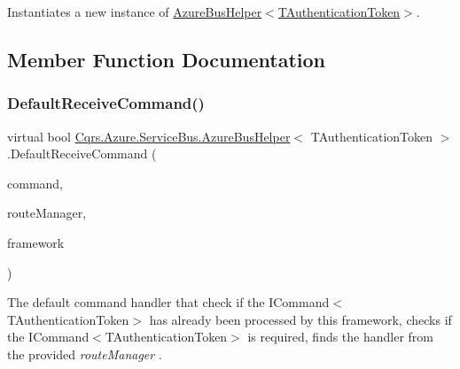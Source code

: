 Instantiates a new instance of \hyperlink{classCqrs_1_1Azure_1_1ServiceBus_1_1AzureBusHelper_af4ca8255d3eb87180c5e24996e1f6e15_af4ca8255d3eb87180c5e24996e1f6e15}{Azure\+Bus\+Helper$<$\+T\+Authentication\+Token$>$}. 



\subsection{Member Function Documentation}
\mbox{\label{classCqrs_1_1Azure_1_1ServiceBus_1_1AzureBusHelper_ae35c260f46f8aa7ba928815187b9088e_ae35c260f46f8aa7ba928815187b9088e}} 
\subsubsection{\texorpdfstring{Default\+Receive\+Command()}{DefaultReceiveCommand()}}
{\footnotesize\ttfamily virtual bool \hyperlink{classCqrs_1_1Azure_1_1ServiceBus_1_1AzureBusHelper}{Cqrs.\+Azure.\+Service\+Bus.\+Azure\+Bus\+Helper}$<$ T\+Authentication\+Token $>$.Default\+Receive\+Command (\begin{DoxyParamCaption}\item[{\hyperlink{interfaceCqrs_1_1Commands_1_1ICommand}{I\+Command}$<$ T\+Authentication\+Token $>$}]{command,  }\item[{\hyperlink{classCqrs_1_1Bus_1_1RouteManager}{Route\+Manager}}]{route\+Manager,  }\item[{string}]{framework }\end{DoxyParamCaption})\hspace{0.3cm}{\ttfamily [virtual]}}



The default command handler that check if the I\+Command$<$\+T\+Authentication\+Token$>$ has already been processed by this framework, checks if the I\+Command$<$\+T\+Authentication\+Token$>$ is required, finds the handler from the provided {\itshape route\+Manager} . 


